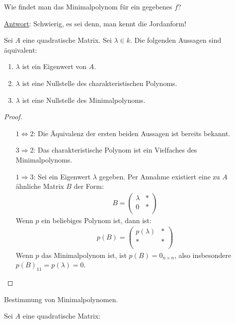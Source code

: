 \documentclass{report}
\newcommand*{\newpar}{\par\vspace{\baselineskip}\noindent}
\newcommand{\ul}[1]{\underline{#1}}
\begin{document}
\begin{question}
 Wie findet man das Minimalpolynom für ein gegebenes $f$?
\end{question}
\newpar
\ul{Antwort}: Schwierig, es sei denn, man kennt die Jordanform!
\begin{proposition}
 Sei $A$ eine quadratische Matrix. Sei $\lambda \in k$. Die folgenden Aussagen sind äquivalent:
 \begin{enumerate}
  \item $\lambda$ ist ein Eigenwert von $A$.
  \item $\lambda$ ist eine Nullstelle des charakteristischen Polynoms.
  \item $\lambda$ ist eine Nullstelle des Minimalpolynoms.
 \end{enumerate}
\end{proposition}
\begin{proof}
\newpar
 \begin{itemize}
  \item[$1 \Leftrightarrow 2$:] Die Äquivalenz der ersten beiden Aussagen ist bereits bekannt.
  \item[$3 \Rightarrow 2$:] Das charakteristische Polynom ist ein Vielfaches des Minimalpolynoms.
  \item[$1 \Rightarrow 3$:] Sei ein Eigenwert $\lambda$ gegeben. Per Annahme existiert eine zu $A$ ähnliche Matrix $B$ der Form:
  \begin{align*}
   B = \begin{pmatrix}
        \lambda & *\\
        0 & *\\
       \end{pmatrix}
  \end{align*}
  Wenn $p$ ein beliebiges Polynom ist, dann ist:
  \begin{align*}
   p(B) = \begin{pmatrix}
           p(\lambda) & *\\
           * & *\\
          \end{pmatrix}
  \end{align*}
  Wenn $p$ das Minimalpolynom ist, ist $p(B) = 0_{n \times n}$, also insbesondere $p(B)_{11} = p(\lambda) = 0$.
 \end{itemize}
\end{proof}
\begin{application}
 Bestimmung von Minimalpolynomen.
\end{application}
\newpar
Sei $A$ eine quadratische Matrix:
\end{document}
